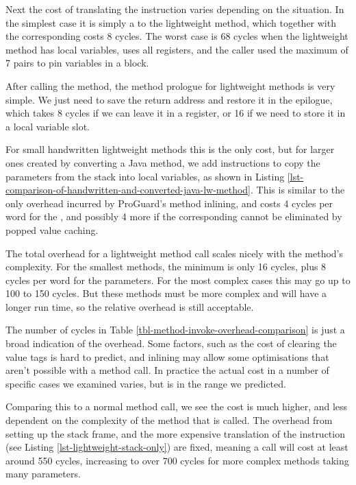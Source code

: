 Next the cost of translating the  instruction varies depending on the situation. In the simplest case it is simply a  to the lightweight method, which together with the corresponding  costs 8 cycles. The worst case is 68 cycles when the lightweight method has local variables, uses all registers, and the caller used the maximum of 7 pairs to pin variables in a  block.

After calling the method, the method prologue for lightweight methods is very simple. We just need to save the return address and restore it in the epilogue, which takes 8 cycles if we can leave it in a register, or 16 if we need to store it in a local variable slot.

For small handwritten lightweight methods this is the only cost, but for larger ones created by converting a Java method, we add  instructions to copy the parameters from the stack into local variables, as shown in Listing \ref{lst-comparison-of-handwritten-and-converted-java-lw-method}. This is similar to the only overhead incurred by ProGuard's method inlining, and costs 4 cycles per word for the , and possibly 4 more if the corresponding  cannot be eliminated by popped value caching.

The total overhead for a lightweight method call scales nicely with the method's complexity. For the smallest methods, the minimum is only 16 cycles, plus 8 cycles per word for the parameters. For the most complex cases this may go up to 100 to 150 cycles. But these methods must be more complex and will have a longer run time, so the relative overhead is still acceptable.

The number of cycles in Table \ref{tbl-method-invoke-overhead-comparison} is just a broad indication of the overhead. Some factors, such as the cost of clearing the value tags is hard to predict, and inlining may allow some optimisations that aren't possible with a method call. In practice the actual cost in a number of specific cases we examined varies, but is in the range we predicted.

Comparing this to a normal method call, we see the cost is much higher, and less dependent on the complexity of the method that is called. The overhead from setting up the stack frame, and the more expensive translation of the  instruction (see Listing \ref{lst-lightweight-stack-only}) are fixed, meaning a call will cost at least around 550 cycles, increasing to over 700 cycles for more complex methods taking many parameters.

